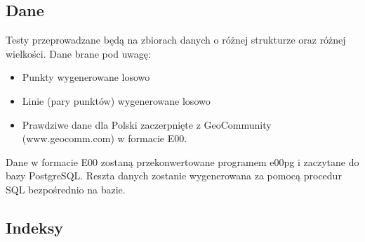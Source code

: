 \documentclass[11pt,a4paper]{article}
\begin{document}
\subsection{Dane}
Testy przeprowadzane będą na zbiorach danych o różnej strukturze oraz różnej wielkości. Dane brane pod uwagę:
\begin{itemize}
	\item Punkty wygenerowane losowo
	\item Linie (pary punktów) wygenerowane losowo
	\item Prawdziwe dane dla Polski zaczerpnięte z GeoCommunity (www.geocomm.com) w formacie E00.
\end{itemize}
Dane w formacie E00 zostaną przekonwertowane programem e00pg i zaczytane do bazy PostgreSQL. Reszta danych zostanie 
wygenerowana za pomocą procedur SQL bezpośrednio na bazie.
\subsection{Indeksy}
\end{document}
